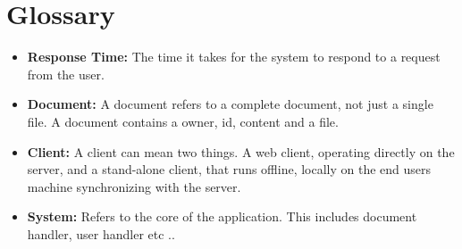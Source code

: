\documentclass[11pt,a4paper]{article}
\begin{document}
\section{Glossary}
\begin{itemize}
\item \textbf{Response Time:} The time it takes for the system to respond to a request from the user.
\item \textbf{Document:} A document refers to a complete document, not just a single file. A document contains a owner, id, content and a file.
\item \textbf{Client:} A client can mean two things. A web client, operating directly on the server, and a stand-alone client, that runs offline, locally on the end users machine synchronizing with the server.
\item \textbf{System:} Refers to the core of the application. This includes document handler, user handler etc ..
\end{itemize}
\end{document}

